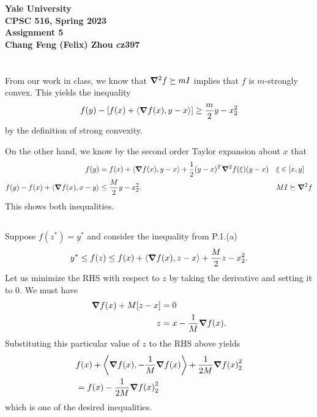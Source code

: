 \documentclass[10pt]{article}
\DeclarePairedDelimiter{\iprod}{\langle}{\rangle}
\let\norm\relax
\DeclarePairedDelimiter{\norm}{\lVert}{\rVert}
\begin{document}
\begin{center}
    {\Large\textbf{Yale University}}\\
    \vspace{3mm}
    {\Large\textbf{CPSC 516, Spring 2023}}\\
    \vspace{2mm}
    {\Large\textbf{Assignment 5}}\\
    \vspace{3mm}
    \textbf{Chang Feng (Felix) Zhou cz397}
\end{center}

\section{}
\subsection{}
From our work in class,
we know that $\grad^2 f\succeq mI$ implies that $f$ is $m$-strongly convex.
This yields the inequality
\[
  f(y) - [f(x) + \iprod{\grad f(x), y-x}] \geq \frac{m}2 \norm{y-x}_2^2
\]
by the definition of strong convexity.

On the other hand,
we know by the second order Taylor expansion about $x$ that
\begin{align*}
  f(y)
  &= f(x) + \iprod{\grad f(x), y-x} + \frac12 (y-x)^T \grad^2 f(\xi) (y-x) &&\xi\in [x, y] \\
  f(y) - f(x) + \iprod{\grad f(x), x-y}
  &\leq \frac{M}2 \norm{y-x}_2^2. &&MI \succeq \grad^2 f
\end{align*}
This shows both inequalities.

\subsection{}
Suppose $f(z^*) = y^*$
and consider the inequality from P.1.(a)
\[
  y^*\leq f(z) \leq f(x) + \iprod{\grad f(x), z-x} + \frac{M}2 \norm{z-x}_2^2.
\]
Let us minimize the RHS with respect to $z$ by taking the derivative and setting it to 0.
We must have
\begin{align*}
  \grad f(x) + M[z-x] &= 0 \\
  z &= x - \frac1M \grad f(x).
\end{align*}
Substituting this particular value of $z$ to the RHS above yields
\begin{align*}
  &f(x) + \iprod*{\grad f(x), -\frac1M \grad f(x)} + \frac1{2M} \norm{\grad f(x)}_2^2 \\
  &= f(x) - \frac1{2M} \norm{\grad f(x)}_2^2
\end{align*}
which is one of the desired inequalities.
\end{document}
